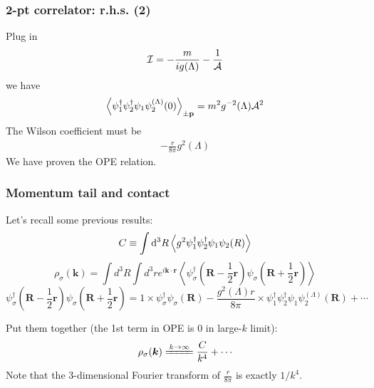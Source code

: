 \begin{frame}
	\frametitle{2-pt correlator: r.h.s. (2)}

	Plug in
	\begin{align}
		\mathcal{I}=-\frac{m}{ig(\Lambda)}-\frac{1}{\mathcal{A}}
	\end{align}
	we have
	\begin{align}
		\expval{\psi^\dagger_1\psi^\dagger_2\psi_1\psi_2^{(\Lambda)}(0)}_{\pm\vb{p}}=m^2g^{-2}(\Lambda)\mathcal{A}^2
		\label{2c}
	\end{align}
	The Wilson coefficient must be
	\begin{align}
		-\frac{r}{8\pi}g^2(\Lambda)
	\end{align}
	We have proven the OPE relation.


\end{frame}

\begin{frame}
	\frametitle{Momentum tail and contact}

	Let's recall some previous results:
	$$C\equiv\int\dd^3R\expval{g^2\psi^\dagger_1\psi^\dagger_2\psi_1\psi_2(R)}$$
	$$\rho_{\sigma}(\boldsymbol{k})=\int d^{3} R \int d^{3} r e^{i \boldsymbol{k} \cdot \boldsymbol{r}}\left\langle\psi_{\sigma}^{\dagger}\left(\boldsymbol{R}-\frac{1}{2} \boldsymbol{r}\right) \psi_{\sigma}\left(\boldsymbol{R}+\frac{1}{2} \boldsymbol{r}\right)\right\rangle$$
	$$\psi_{\sigma}^{\dagger}\left(\boldsymbol{R}-\frac{1}{2} \boldsymbol{r}\right) \psi_{\sigma}\left(\boldsymbol{R}+\frac{1}{2} \boldsymbol{r}\right) =1\times\psi_{\sigma}^{\dagger} \psi_{\sigma}(\mathbf{R})-\frac{g^{2}(\Lambda) r} {8 \pi}\times\psi_{1}^{\dagger} \psi_{2}^{\dagger} \psi_{1} \psi_{2}^{(\Lambda)}(\mathbf{R})+\cdots$$

	Put them together (the 1st term in OPE is 0 in large-$k$ limit):
	\begin{align}
		\rho_{\sigma}(\boldsymbol{k})\xlongequal{k\to\infty}\frac{C}{k^4}+\cdots
	\end{align}
	Note that the 3-dimensional Fourier transform of $\frac{r}{8\pi}$ is exactly $1/k^4$.

\end{frame}

